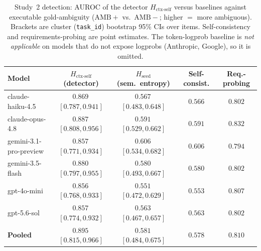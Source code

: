 \documentclass[acmsmall,screen,nonacm]{acmart}
\newcommand{\Hseed}{\ensuremath{H_{\mathrm{seed}}}}
\newcommand{\Hctx}{\ensuremath{H_{\text{ctx-self}}}}
\begin{document}
\begin{table}[t]
\centering
\caption{Study~2 detection: AUROC of the detector \Hctx{} versus baselines against executable
gold-ambiguity ($\mathrm{AMB}{+}$ vs.\ $\mathrm{AMB}{-}$; higher $=$ more ambiguous). Brackets are cluster
(\texttt{task\_id}) bootstrap 95\% CIs over items. Self-consistency and requirements-probing are point
estimates. The token-logprob baseline is \emph{not applicable} on models that do not expose logprobs
(Anthropic, Google), so it is omitted.}
\label{tab:lps-auroc}
\footnotesize
\setlength{\tabcolsep}{4pt}
\begin{tabular}{@{}lcccc@{}}
\toprule
Model & \Hctx{} (detector) & \Hseed{} (sem.\ entropy) & Self-consist. & Req.-probing \\
\midrule
claude-haiku-4.5 & $0.869$\,$[0.787,0.941]$ & $0.567$\,$[0.483,0.648]$ & $0.566$ & $0.802$ \\
claude-opus-4.8  & $0.887$\,$[0.808,0.956]$ & $0.591$\,$[0.529,0.662]$ & $0.591$ & $0.832$ \\
gemini-3.1-pro-preview & $0.857$\,$[0.771,0.934]$ & $0.606$\,$[0.534,0.682]$ & $0.606$ & $0.794$ \\
gemini-3.5-flash & $0.880$\,$[0.797,0.955]$ & $0.580$\,$[0.493,0.667]$ & $0.580$ & $0.802$ \\
gpt-4o-mini      & $0.856$\,$[0.768,0.933]$ & $0.551$\,$[0.472,0.629]$ & $0.553$ & $0.807$ \\
gpt-5.6-sol      & $0.857$\,$[0.774,0.932]$ & $0.563$\,$[0.467,0.657]$ & $0.563$ & $0.802$ \\
\midrule
\textbf{Pooled}  & $\mathbf{0.895}$\,$[0.815,0.966]$ & $0.581$\,$[0.484,0.675]$ & $0.578$ & $0.810$ \\
\bottomrule
\end{tabular}
\end{table}
\end{document}
